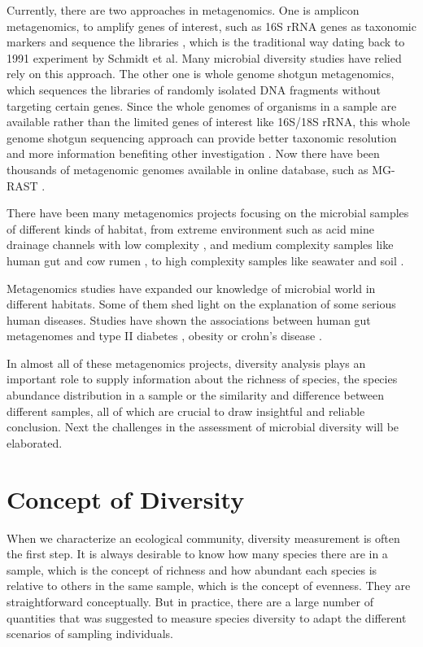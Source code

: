 Currently, there are two approaches in metagenomics. One is amplicon metagenomics, to amplify genes of interest, such as 
16S rRNA genes as taxonomic markers
and sequence the libraries \cite{Sogin:2006aa}, which is the traditional way dating back to 1991 experiment by Schmidt et al. Many microbial diversity studies have relied 
rely on this approach. The other one is whole genome shotgun metagenomics, which sequences
the libraries of randomly isolated DNA fragments without targeting certain genes. Since the whole genomes of organisms in a sample are available rather than the limited
 genes of interest like 16S/18S rRNA, this whole genome shotgun sequencing approach can provide better taxonomic resolution and
 more information benefiting other investigation \cite{Tyson:2004aa} \cite{Qin:2010aa}.  Now there have been thousands of metagenomic genomes available
in online database, such as MG-RAST \cite{Glass:2010aa}.
 
There have been many metagenomics projects focusing on the microbial samples of different kinds of 
habitat, from extreme environment such as acid mine drainage channels with low complexity \cite{Tyson:2004aa}, and medium complexity
 samples like human gut \cite{Qin:2010aa} and cow rumen \cite{Hess:2011aa}, to high complexity samples like seawater \cite{Venter:2004aa} and 
 soil \cite{Gilbert:2010aa}.
 
Metagenomics studies have expanded our knowledge of microbial world in different habitats.
Some of them shed light on the explanation of some serious human diseases. Studies have shown the associations between
human gut metagenomes and type II diabetes \cite{Qin:2012aa}, obesity \cite{Turnbaugh:2009aa, Kau:2011aa} or crohn's disease \cite{Morgan:2012aa}. 

In almost all of these metagenomics projects, diversity analysis plays an important role to supply information about the 
richness of species, the species abundance distribution in a sample or the similarity and difference between different samples, 
all of which are crucial to draw insightful and reliable conclusion. Next the challenges in the assessment of microbial diversity will 
be elaborated.



\section{Concept of Diversity}
When we characterize an ecological community, diversity measurement is often the first step.
It is always desirable to know how many species there are in a sample, which is the concept of richness and how abundant each
 species is relative to others in the same sample, which is the concept of evenness. 
 They are straightforward conceptually. But in practice, there are a large number of quantities that was suggested
 to measure species diversity to adapt the different scenarios of sampling individuals. 

